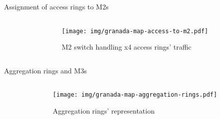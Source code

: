 \documentclass{beamer}
\begin{document}
\begin{frame}{Assignment of access rings to M2s}
{\begin{columns}[T]
\begin{column}{0.38\textwidth}
{\begin{minipage}{2\textwidth}
\begin{algorithm}[H]
            \end{algorithm}
            \end{minipage}
            }
        \end{column}

        \begin{column}{0.6\textwidth}
            \begin{figure}
                \texttt{[image: img/granada-map-access-to-m2.pdf]}
                \caption{M2 switch handling x4 access rings' traffic}
            \end{figure}
        \end{column}
    \end{columns}
    }
\end{frame}





\begin{frame}{Aggregation rings and M3s}
    \begin{columns}[T]
        \begin{column}{0.38\textwidth}
            \vspace{2em}
        \end{column}

        \begin{column}{0.6\textwidth}
            \begin{figure}
                \texttt{[image: img/granada-map-aggregation-rings.pdf]}
                \caption{Aggregation rings' representation}
            \end{figure}
        \end{column}
    \end{columns}
\end{frame}
\end{document}

